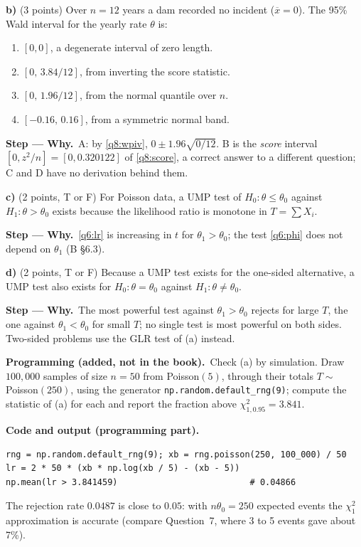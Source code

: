 \documentclass[11pt,a4paper]{article}
\newif\ifsolucoes
\numberwithin{equation}{questao}   %
\newcommand{\programacao}{\par\smallskip\noindent\textbf{Programming (added, not in the book).}~}
\newenvironment{alternativas}{\begin{enumerate}[label=\Alph*.,leftmargin=2.2em,topsep=1pt]}{\end{enumerate}}
\newcommand{\gabarito}[1]{\ifsolucoes\par\noindent\textbf{Key:}~#1\fi}
\newcommand{\passo}[2]{\par\smallskip\noindent\textbf{Step --- #1.}~#2}
\newcommand{\refbib}[1]{\par\smallskip\noindent{\footnotesize\color{black!60}\textbf{Ref:} #1}}
\newcommand{\codehead}{\par\smallskip\noindent\textbf{Code and output (programming part).}\par}
\newcommand{\1}{\mathbf{1}}
\begin{document}
\textbf{b)} (3 points) Over $n=12$ years a dam recorded no incident ($\overline x=0$). The 95\%
Wald interval for the yearly rate $\theta$ is:
\begin{alternativas}
\item $[0,0]$, a degenerate interval of zero length.
\item $[0,\,3.84/12]$, from inverting the score statistic.
\item $[0,\,1.96/12]$, from the normal quantile over $n$.
\item $[-0.16,\,0.16]$, from a symmetric normal band.
\end{alternativas}
\gabarito{A}
\begin{sol}
\passo{Why}{A: by \eqref{q8:wpiv}, $0\pm1.96\sqrt{0/12}$. B is the \emph{score} interval
$[0,z^2/n]=[0,0.320122]$ of \eqref{q8:score}, a correct answer to a different question; C and D
have no derivation behind them.}
\end{sol}

\textbf{c)} (2 points, T or F) For Poisson data, a UMP test of $H_0:\theta\le\theta_0$ against
$H_1:\theta>\theta_0$ exists because the likelihood ratio is monotone in $T=\sum X_i$.
\gabarito{T}
\begin{sol}
\passo{Why}{\eqref{q6:lr} is increasing in $t$ for $\theta_1>\theta_0$; the test \eqref{q6:phi} does
not depend on $\theta_1$ (B §6.3).}
\end{sol}

\textbf{d)} (2 points, T or F) Because a UMP test exists for the one-sided alternative, a UMP test
also exists for $H_0:\theta=\theta_0$ against $H_1:\theta\ne\theta_0$.
\gabarito{F}
\begin{sol}
\passo{Why}{The most powerful test against $\theta_1>\theta_0$ rejects for large $T$, the one
against $\theta_1<\theta_0$ for small $T$; no single test is most powerful on both sides. Two-sided
problems use the GLR test of (a) instead.}
\refbib{B §6.3--6.5.}
\end{sol}

\programacao Check (a) by simulation. Draw $100{,}000$ samples of size $n=50$ from
Poisson$(5)$, through their totals $T\sim$ Poisson$(250)$, using the generator
\texttt{np.random.default\_rng(9)}; compute the statistic of (a) for each and report the fraction
above $\chi^2_{1,0.95}=3.841$.
\begin{sol}
\codehead
{\small
\begin{verbatim}
rng = np.random.default_rng(9); xb = rng.poisson(250, 100_000) / 50
lr = 2 * 50 * (xb * np.log(xb / 5) - (xb - 5))
np.mean(lr > 3.841459)                          # 0.04866
\end{verbatim}
}
The rejection rate $0.0487$ is close to $0.05$: with $n\theta_0=250$ expected events the $\chi^2_1$
approximation is accurate (compare Question~7, where 3 to 5 events gave about 7\%).
\end{sol}
\end{document}
